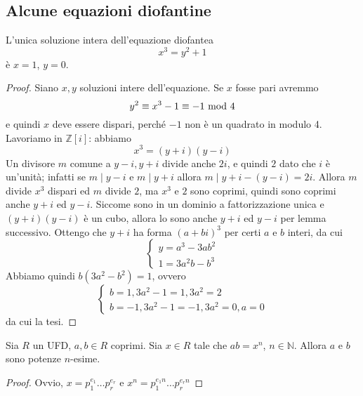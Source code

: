 \subsection{Alcune equazioni diofantine}
\begin{teorema}
	L'unica soluzione intera dell'equazione diofantea
	\begin{equation*}
	x^3=y^2+1
	\end{equation*}
	è $x=1$, $y=0$.
\end{teorema}
\begin{proof}
	Siano $x,y$ soluzioni intere dell'equazione. Se $x$ fosse pari avremmo 
	\begin{equation*}
	y^2\equiv x^3-1\equiv -1 \ \mathrm{mod}\ 4
	\end{equation*}
	 e quindi $x$ deve essere dispari, perché $-1$ non è un quadrato in modulo 4. Lavoriamo in $\mathbb{Z}[i]$: abbiamo 
	 \begin{equation*}
	 x^3=(y+i)(y-i)
	 \end{equation*}
	 Un divisore $m$ comune a $y-i, y+i$ divide anche $2i$, e quindi $2$ dato che $i$ è un'unità; infatti se $m \mid y-i$ e $m \mid y+i$ allora $m \mid y+i-(y-i) = 2i$. Allora $m$ divide $x^3$ dispari ed $m$ divide $2$, ma $x^3$ e $2$ sono coprimi, quindi sono coprimi anche $y+i$ ed $y-i$. Siccome sono in un dominio a fattorizzazione unica e $(y+i)(y-i)$ è un cubo, allora lo sono anche $y+i$ ed $y-i$ per lemma successivo. Ottengo che $y+i$ ha forma $(a+bi)^3$ per certi $a$ e $b$ interi, da cui 
	 \begin{equation*}
	 \begin{cases}
	 y=a^3-3ab^2\\1=3a^2b-b^3
	 \end{cases}
	 \end{equation*}
	 Abbiamo quindi $b(3a^2-b^2)=1$, ovvero 
	 \begin{equation*}
	 \begin{cases}
	 b=1, 3a^2-1=1, 3a^2=2\\
	 b=-1, 3a^2-1=-1, 3a^2=0, a=0
	 \end{cases}
	 \end{equation*}
	 da cui la tesi.
\end{proof}
\begin{lemma}
	Sia $R$ un UFD, $a,b\in R$ coprimi. Sia $x\in R$ tale che $ab=x^n$, $n\in\mathbb{N}$. Allora $a$ e $b$ sono potenze $n$-esime.
\end{lemma}
\begin{proof}
	Ovvio, $x=p_1^{e_1}\dots p_r^{e_r}$ e $x^n=p_1^{e_1n}\dots p_r^{e_rn}$
\end{proof}

